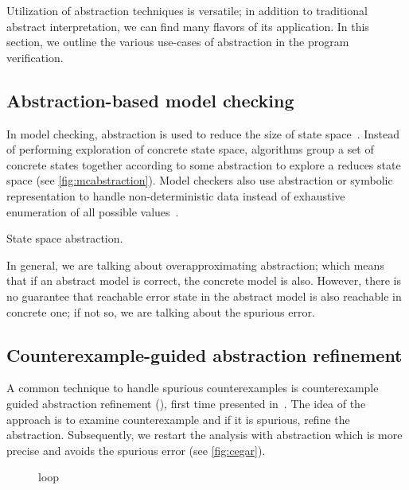 Utilization of abstraction techniques is versatile; in addition to traditional
abstract interpretation, we can find many flavors of its application. In this
section, we outline the various use-cases of abstraction in the program
verification.

\subsection{Abstraction-based model checking}

In model checking, abstraction is used to reduce the size of state space~\cite{Pelnek2006}.
Instead of performing exploration of concrete state space, algorithms group a
set of concrete states together according to some abstraction to explore a
reduces state space (see \autoref{fig:mcabstraction}). Model checkers also use
abstraction or symbolic representation to handle non-deterministic data instead
of exhaustive enumeration of all possible values~\cite{Mrazek2016}.

\begin{marginfigure}


\caption{State space abstraction.}
\label{fig:mcabstraction}
\end{marginfigure}

In general, we are talking about overapproximating abstraction; which means
that if an abstract model is correct, the concrete model is also. However,
there is no guarantee that reachable error state in the abstract model is also
reachable in concrete one; if not so, we are talking about the spurious error.

\subsection{Counterexample-guided abstraction refinement}

A common technique to handle spurious counterexamples is counterexample guided
abstraction refinement (\cegar), first time presented in~\cite{Clarke2000}.
The idea of the \cegar approach is to examine counterexample and if it is spurious,
refine the abstraction. Subsequently, we restart the analysis with abstraction
which is more precise and avoids the spurious error (see \autoref{fig:cegar}).

\begin{figure}[h]


\caption{\cegar loop}
\label{fig:cegar}
\end{figure}

